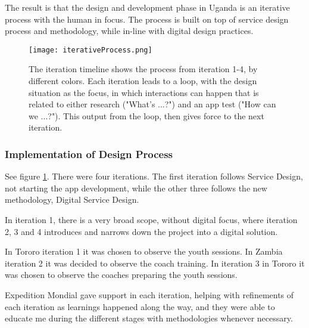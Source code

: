 The result is that the design and development phase in Uganda is an iterative process with the human in focus. The process is built on top of service design process and methodology, while in-line with digital design practices.

\begin{figure}[h]
    \centering
    \texttt{[image: iterativeProcess.png]}
    \caption{The iteration timeline shows the process from iteration 1-4, by different colors. Each iteration leads to a loop, with the design situation as the focus, in which interactions can happen that is related to either research ("What's ...?") and an app test ("How can we ...?"). This output from the loop, then gives force to the next iteration.}
    \label{fig:iterative-process}
\end{figure}


\subsubsection{Implementation of Design Process}
See figure \ref{fig:iterative-process}. There were four iterations. The first iteration follows Service Design, not starting the app development, while the other three follows the new methodology, Digital Service Design.

In iteration 1, there is a very broad scope, without digital focus, where iteration 2, 3 and 4 introduces and narrows down the project into a digital solution.

In Tororo iteration 1 it was chosen to observe the youth sessions. In Zambia iteration 2 it was decided to observe the coach training. In iteration 3 in Tororo it was chosen to observe the coaches preparing the youth sessions.

Expedition Mondial gave support in each iteration, helping with refinements of each iteration as learnings happened along the way, and they were able to educate me during the different stages with methodologies whenever necessary.
